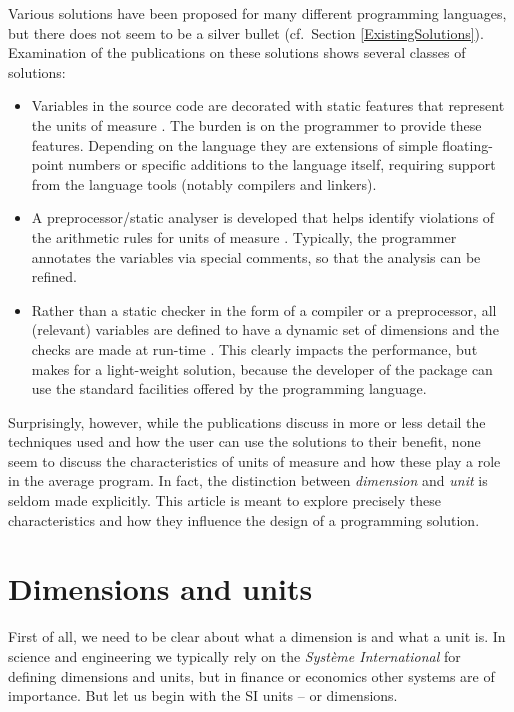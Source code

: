 \documentclass{article}
\begin{document}
Various solutions have been proposed for many different programming languages, but there does not seem to be a
silver bullet (cf.\ Section \ref{ExistingSolutions}). Examination of the publications on these solutions shows several
classes of solutions:
\begin{itemize}
\item
Variables in the source code are decorated with static features that represent the units of measure
\cite{DimensionalityCheckingAda, BlogAdaPhysicalUnitsGeneric, QuaffFortranPackage, PhysicalEngineeringUnitsN2113}. The burden is
on the programmer to provide these features. Depending on the language they are extensions of simple floating-point numbers
or specific additions to the language itself, requiring support from the language tools (notably compilers and linkers).
\item
A preprocessor/static analyser is developed that helps identify violations of the arithmetic rules for units of measure
\cite{SimConFPTCheckingUnits,CamFortCorrectness}.
Typically, the programmer annotates the variables via special comments, so that the analysis can be refined.
\item
Rather than a static checker in the form of a compiler or a preprocessor, all (relevant) variables are defined to have
a dynamic set of dimensions and the checks are made at run-time \cite{PhysUnitsPetty}. This clearly impacts the performance, but makes for
a light-weight solution, because the developer of the package can use the standard facilities offered by the programming
language.
\end{itemize}

Surprisingly, however, while the publications discuss in more or less detail the techniques used and how the user can use
the solutions to their benefit, none seem to discuss the characteristics of units of measure and how these play a role
in the average program. In fact, the distinction between \emph{dimension} and \emph{unit} is seldom made explicitly. This
article is meant to explore precisely these characteristics and how they influence the design of a programming solution.


\section{Dimensions and units}
First of all, we need to be clear about what a dimension is and what a unit is. In science and engineering we typically
rely on the \emph{Syst\`eme International} for defining dimensions and units, but in finance or economics other systems
are of importance. But let us begin with the SI units -- or dimensions.
\end{document}
